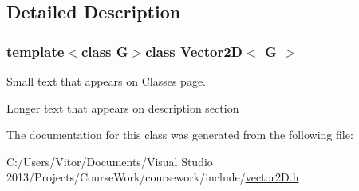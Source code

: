 \subsection{Detailed Description}
\subsubsection*{template$<$class G$>$class Vector2\+D$<$ G $>$}

Small text that appears on Classes page. 

Longer text that appears on description section 

The documentation for this class was generated from the following file\+:\begin{DoxyCompactItemize}
\item 
C\+:/\+Users/\+Vitor/\+Documents/\+Visual Studio 2013/\+Projects/\+Course\+Work/coursework/include/\hyperlink{vector2_d_8h}{vector2\+D.\+h}\end{DoxyCompactItemize}
